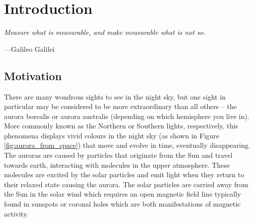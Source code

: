 
\chapter{Introduction} %

\label{Chapter1} %


\newcommand{\keyword}[1]{\textbf{#1}}
\newcommand{\tabhead}[1]{\textbf{#1}}
\newcommand{\code}[1]{\texttt{#1}}
\newcommand{\file}[1]{\texttt{\bfseries#1}}
\newcommand{\option}[1]{\texttt{\itshape#1}}

\newcommand{\ts}{\textsuperscript}
\newcommand{\caII}{Ca II H \& K\xspace}
\newcommand{\Rprime}{$R^{'}_{HK}$\xspace}
\newcommand{\Smw}{$S_{MW}$\xspace}

\newcommand{\esp}{\textit{ESPaDOnS}\xspace}
\newcommand{\narval}{\textit{NARVAL}\xspace}
\newcommand{\Halpha}{H-$\alpha$\xspace}

\newcommand{\Ro}{$R_{0}$\xspace}
\newcommand{\tauc}{$\tau_{c}$\xspace}


\epigraph{\itshape Measure what is measurable, and make measurable what is not so.}{---Galileo Galilei}

\section{Motivation}

There are many wondrous sights to see in the night sky, but one sight in particular may be considered to be more extraordinary than all others -- the aurora borealis or aurora australis (depending on which hemisphere you live in). More commonly known as the Northern or Southern lights, respectively, this phenomena displays vivid colours in the night sky (as shown in Figure \ref{fig:aurora_from_space}) that move and evolve in time, eventually disappearing. The auroras are caused by particles that originate from the Sun and travel towards earth, interacting with molecules in the upper atmosphere. These molecules are excited by the solar particles and emit light when they return to their relaxed state causing the aurora. The solar particles are carried away from the Sun in the solar wind \citep{Parker_1958} which requires an open magnetic field line typically found in sunspots or coronal holes which are both manifestations of magnetic activity.

